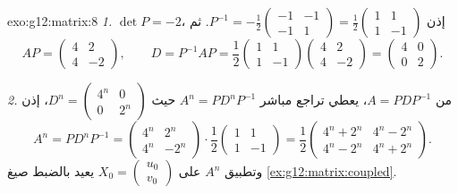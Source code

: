 \begin{solution}{exo:g12:matrix:8}
\emph{1.} $\det P = -2$، إذن
$P^{-1} = -\frac12\begin{pmatrix} -1 & -1\\ -1 & 1\end{pmatrix}
= \frac12\begin{pmatrix} 1 & 1\\ 1 & -1\end{pmatrix}$. ثم
\[
AP = \begin{pmatrix} 4 & 2\\ 4 & -2 \end{pmatrix}, \qquad
D = P^{-1}AP = \frac12\begin{pmatrix} 1&1\\1&-1\end{pmatrix}
\begin{pmatrix} 4&2\\4&-2\end{pmatrix}
= \begin{pmatrix} 4 & 0\\ 0 & 2\end{pmatrix}.
\]

\emph{2.} من $A = PDP^{-1}$، يعطي تراجع مباشر
$A^n = PD^nP^{-1}$ حيث
$D^n = \begin{pmatrix} 4^n & 0\\ 0 & 2^n\end{pmatrix}$، إذن
\[
A^n = P D^n P^{-1}
= \begin{pmatrix} 4^n & 2^n\\ 4^n & -2^n\end{pmatrix}\cdot
\frac12\begin{pmatrix} 1&1\\1&-1\end{pmatrix}
= \frac12\begin{pmatrix} 4^n + 2^n & 4^n - 2^n\\
4^n - 2^n & 4^n + 2^n\end{pmatrix}.
\]
وتطبيق $A^n$ على $X_0 = \begin{pmatrix} u_0\\v_0\end{pmatrix}$ يعيد
بالضبط صيغ \cref{ex:g12:matrix:coupled}.
\end{solution}

